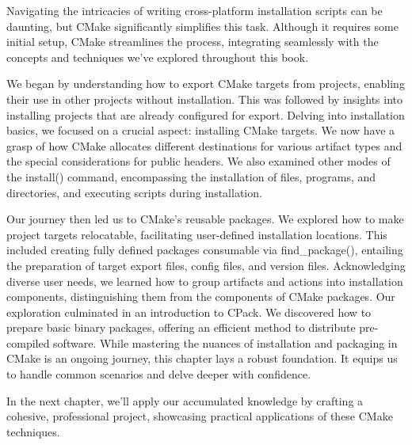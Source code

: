 Navigating the intricacies of writing cross-platform installation scripts can be daunting, but CMake significantly simplifies this task. Although it requires some initial setup, CMake streamlines the process, integrating seamlessly with the concepts and techniques we’ve explored throughout this book.

We began by understanding how to export CMake targets from projects, enabling their use in other projects without installation. This was followed by insights into installing projects that are already configured for export. Delving into installation basics, we focused on a crucial aspect: installing CMake targets. We now have a grasp of how CMake allocates different destinations for various artifact types and the special considerations for public headers. We also examined other modes of the install() command, encompassing the installation of files, programs, and directories, and executing scripts during installation.

Our journey then led us to CMake’s reusable packages. We explored how to make project targets relocatable, facilitating user-defined installation locations. This included creating fully defined packages consumable via find\_package(), entailing the preparation of target export files, config files, and version files. Acknowledging diverse user needs, we learned how to group artifacts and actions into installation components, distinguishing them from the components of CMake packages. Our exploration culminated in an introduction to CPack. We discovered how to prepare basic binary packages, offering an efficient method to distribute pre-compiled software. While mastering the nuances of installation and packaging in CMake is an ongoing journey, this chapter lays a robust foundation. It equips us to handle common scenarios and delve deeper with confidence.

In the next chapter, we’ll apply our accumulated knowledge by crafting a cohesive, professional project, showcasing practical applications of these CMake techniques.


















